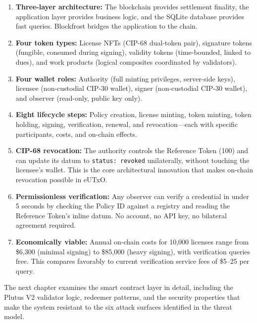 \begin{enumerate}[leftmargin=*]
  \item \textbf{Three-layer architecture:} The blockchain provides settlement finality, the application layer provides business logic, and the SQLite database provides fast queries. Blockfrost bridges the application to the chain.

  \item \textbf{Four token types:} License NFTs (CIP-68 dual-token pair), signature tokens (fungible, consumed during signing), validity tokens (time-bounded, linked to dues), and work products (logical composites coordinated by validators).

  \item \textbf{Four wallet roles:} Authority (full minting privileges, server-side keys), licensee (non-custodial CIP-30 wallet), signer (non-custodial CIP-30 wallet), and observer (read-only, public key only).

  \item \textbf{Eight lifecycle steps:} Policy creation, license minting, token minting, token holding, signing, verification, renewal, and revocation---each with specific participants, costs, and on-chain effects.

  \item \textbf{CIP-68 revocation:} The authority controls the Reference Token (100) and can update its datum to \texttt{status: revoked} unilaterally, without touching the licensee's wallet. This is the core architectural innovation that makes on-chain revocation possible in eUTxO.

  \item \textbf{Permissionless verification:} Any observer can verify a credential in under 5 seconds by checking the Policy ID against a registry and reading the Reference Token's inline datum. No account, no API key, no bilateral agreement required.

  \item \textbf{Economically viable:} Annual on-chain costs for 10,000 licenses range from \$6,300 (minimal signing) to \$85,000 (heavy signing), with verification queries free. This compares favorably to current verification service fees of \$5--25 per query.
\end{enumerate}

The next chapter examines the smart contract layer in detail, including the Plutus V2 validator logic, redeemer patterns, and the security properties that make the system resistant to the six attack surfaces identified in the threat model.

